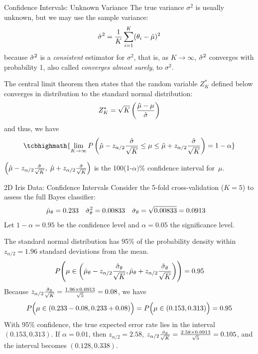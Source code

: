 \begin{frame}{Confidence Intervals: Unknown Variance}
The true variance
$\sigma^2$ is usually unknown, but we may use
the sample variance:
\begin{align*}
  \hat{\sigma}^2 = {1 \over K} \sum_{i=1}^K (\theta_i - \hat{\mu})^2
\end{align*}
because $\hat{\sigma}^2$ is a {\em consistent} estimator for
$\sigma^2$, that is, as $K\to\infty$, $\hat{\sigma}^2$ converges with
probability 1, also called {\em converges almost surely}, to
$\sigma^2$. 

\medskip
The central limit theorem then states that the random
variable $Z_K^*$ def\/{i}ned below converges in distribution to the
standard normal distribution:
\begin{align*}
  Z_K^* = \sqrt{K} \left({\hat{\mu} - \mu \over \hat{\sigma}}\right)
\end{align*}
and thus, we have
\begin{align*}
\tcbhighmath{
  \lim_{K\to\infty} P\lB(\hmu - z_{\alpha/2}{\hsigma \over \sqrt{K}} \le \mu \le
  \hmu + z_{\alpha/2}{\hsigma \over \sqrt{K}} \rB) = 1-\alpha
}
\end{align*}

\medskip
$\left(\hat{\mu} - z_{\alpha/2}{\hat{\sigma} \over \sqrt{K}},\;
  \hat{\mu} + z_{\alpha/2}{\hat{\sigma} \over \sqrt{K}} \right)$ is the 100(1-$\alpha)\%$
  conf\/{i}dence interval for~$\mu$.
\end{frame}


\begin{frame}{2D Iris Data: Confidence Intervals}
Consider the 5-fold
cross-validation ($K=5$) to assess the full
Bayes classif\/{i}er:  
\begin{align*}
  \hat{\mu}_\theta &= 0.233 & \hat{\sigma}^2_\theta & = 0.00833 &
  \hat{\sigma}_\theta & =
  \sqrt{0.00833} = 0.0913
\end{align*}
Let $1-\alpha = 0.95$ be the conf\/{i}dence level and $\alpha=0.05$ the significance level. 

The standard normal distribution has 95\% of the probability density within
$z_{\alpha/2}=1.96$ standard deviations from the mean.
\begin{align*}
  P\Biggl( \mu \in \left(\hat{\mu}_\theta - z_{\alpha/2}{\hat{\sigma}_\theta \over
  \sqrt{K}}, \hat{\mu}_\theta +
  z_{\alpha/2}{\hat{\sigma}_\theta \over \sqrt{K}}\right) \Biggr) = 0.95
\end{align*}
Because $z_{\alpha/2}{\hat{\sigma}_\theta \over \sqrt{K}} = {1.96
\times 0.0913 \over \sqrt{5}} = 0.08$, we have
\begin{align*}
  P\Bigl( \mu \in (0.233 - 0.08, 0.233 + 0.08) \Bigr) =
  P\Bigl( \mu \in (0.153, 0.313) \Bigr) = 0.95
\end{align*}
With 95\% conf\/{i}dence, the true expected error rate lies
in the interval $(0.153,0.313)$.
If $\alpha=0.01$, then $z_{\alpha/2} = 2.58$,
$z_{\alpha/2}{\hat{\sigma}_\theta \over \sqrt{K}} = {2.58
\times 0.0913 \over \sqrt{5}} = 0.105$, and the interval 
becomes $(0.128,0.338)$.
%
\end{frame}



